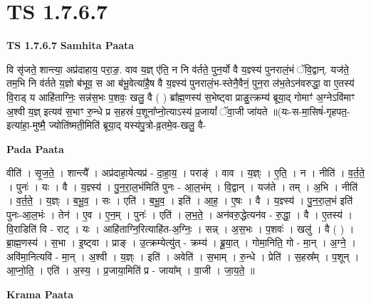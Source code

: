 \documentclass[17pt]{extarticle}
\begin{document}
\section{ TS 1.7.6.7 }

\textbf{TS 1.7.6.7 } \newline
\textbf{Samhita Paata} \newline

वि सृ॑जते॒ शान्त्या॒ अप्र॑दाहाय॒ परा॒ङ॒. वाव य॒ज्ञ् ए॑ति॒ न नि व॑र्तते॒ पुन॒र्यो वै य॒ज्ञ्स्य॑ पुनरालं॒भं ॅवि॒द्वान्. यज॑ते॒ तम॒भि नि व॑र्तते य॒ज्ञो ब॑भूव॒ स आ ब॑भू॒वेत्या॑है॒ष वै य॒ज्ञ्स्य॑ पुनरालं॒भ-स्तेनै॒वैनं॒ पुन॒रा ल॑भ॒तेऽन॑वरुद्धा॒ वा ए॒तस्य॑ वि॒राड् य आहि॑ताग्निः॒ सन्न॑स॒भः प॒शवः॒ खलु॒ वै ( ) ब्रा᳚ह्म॒णस्य॑ स॒भेष्ट्वा प्राङु॒त्क्रम्य॑ ब्रूया॒द् गोमाꣳ॑ अ॒ग्नेऽवि॑माꣳ अ॒श्वी य॒ज्ञ् इत्यव॑ स॒भाꣳ रु॒न्धे प्र स॒हस्रं॑ प॒शूना᳚प्नो॒त्याऽस्य॑ प्र॒जायां᳚ ॅवा॒जी जा॑यते ॥(यः-स-मा॒सिषं॑-गृहपत॒-इत्या॑हा॒-मुष्मै॒ ज्योति॑ष्मती॒मिति॑ ब्रूया॒द् यस्य॑पु॒त्रो-व्र॒तमे॒व-खलु॒ वै- \newline

\textbf{Pada Paata} \newline

वीति॑ । सृ॒ज॒ते॒ । शान्त्यै᳚ । अप्र॑दाहा॒येत्यप्र॑ - दा॒हा॒य॒ । पराङ्॑ । वाव । य॒ज्ञ्ः । ए॒ति॒ । न । नीति॑ । व॒र्त॒ते॒ । पुनः॑ । यः । वै । य॒ज्ञ्स्य॑ । पु॒न॒रा॒ल॒भंमिति॑ पुनः - आ॒ल॒भंम् । वि॒द्वान् । यज॑ते । तम् । अ॒भि । नीति॑ । व॒र्त॒ते॒ । य॒ज्ञ्ः । ब॒भू॒व॒ । सः । एति॑ । ब॒भू॒व॒ । इति॑ । आ॒ह॒ । ए॒षः । वै । य॒ज्ञ्स्य॑ । पु॒न॒रा॒ल॒भं इति॑ पुनः-आ॒ल॒भंः । तेन॑ । ए॒व । ए॒न॒म् । पुनः॑ । एति॑ । ल॒भ॒ते॒ । अन॑वरु॒द्धेत्यन॑व - रु॒द्धा॒ । वै । ए॒तस्य॑ । वि॒राडिति॑ वि - राट् । यः । आहि॑ताग्नि॒रित्याहि॑त-अ॒ग्निः॒ । सन्न् । अ॒स॒भः । प॒शवः॑ । खलु॑ । वै ( ) । ब्रा॒ह्म॒णस्य॑ । स॒भा । इ॒ष्ट्वा । प्राङ् । उ॒त्क्रम्येत्यु॑त् - क्रम्य॑ । ब्रू॒या॒त् । गोमा॒निति॒ गो - मा॒न् । अ॒ग्ने॒ । अवि॑मा॒नित्यवि॑ - मा॒न् । अ॒श्वी । य॒ज्ञ्ः । इति॑ । अवेति॑ । स॒भाम् । रु॒न्धे । प्रेति॑ । स॒हस्र᳚म् । प॒शून् । आ॒प्नो॒ति॒ । एति॑ । अ॒स्य॒ । प्र॒जाया॒मिति॑ प्र - जाया᳚म् । वा॒जी । जा॒य॒ते॒ ॥  \newline


\textbf{Krama Paata} \newline
\end{document}
